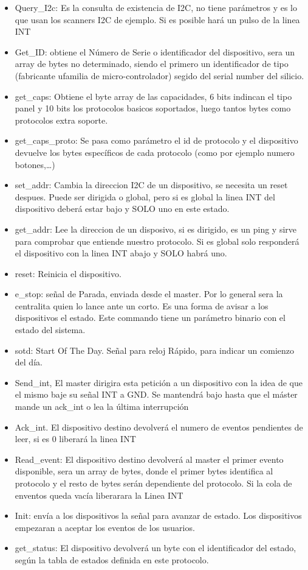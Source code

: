 \begin{itemize}
    \item Query\_I2c: Es la consulta de existencia de I2C, no tiene parámetros y es lo que usan los scanners I2C
    de ejemplo. Si es posible hará un pulso de la linea INT
    \item Get\_ID: obtiene el Número de Serie o identificador del dispositivo, sera un array de bytes
    no determinado, siendo el primero un identificador de tipo (fabricante ufamilia de micro-controlador)
    segido del serial number del silicio.
    \item get\_caps: Obtiene el byte array de las capacidades, 6 bits indincan el tipo panel y 10 bits los
    protocolos basicos soportados, luego tantos bytes como protocolos extra soporte.
    \item get\_caps\_proto: Se pasa como parámetro el id de protocolo y el dispositivo devuelve los bytes
    específicos de cada protocolo (como por ejemplo numero botones,…)
    \item set\_addr: Cambia la direccion I2C de un dispositivo, se necesita un reset despues. Puede ser dirigida
    o global, pero si es global la linea INT del dispositivo deberá estar bajo y SOLO uno en este estado.
    \item get\_addr: Lee la direccion de un disposivo, si es dirigido, es un ping y sirve para comprobar
    que entiende nuestro protocolo. Si es global solo responderá el dispositivo con la linea INT abajo y SOLO
    habrá uno.
    \item reset: Reinicia el dispositivo.
    \item e\_stop: señal de Parada, enviada desde el master. Por lo general sera la centralita quien lo lance
    ante un corto. Es una forma de avisar a los dispositivos el estado. Este commando tiene un parámetro binario
    con el estado del sistema.
    \item sotd: Start Of The Day. Señal para reloj Rápido, para indicar un comienzo del día.
    \item Send\_int, El master dirigira esta petición a un dispositivo con la idea de que el mismo baje su señal
    INT a GND. Se mantendrá bajo hasta que el máster mande un ack\_int o lea la última interrupción 
    \item Ack\_int. El dispositivo destino devolverá el numero de eventos pendientes de leer, si es 0 liberará
    la linea INT
    \item Read\_event: El dispositivo destino devolverá al master el primer evento disponible, sera un array de
    bytes, donde el primer bytes identifica al protocolo y el resto de bytes serán dependiente del protocolo.
    Si la cola de enventos queda vacía liberarara la Linea INT
    \item Init: envía a los dispositivos la señal para avanzar de estado. Los dispositivos empezaran a aceptar
    los eventos de los usuarios.
    \item get\_status: El dispositivo devolverá un byte con el identificador del estado, según la tabla de
    estados definida en este protocolo.
    
\end{itemize}